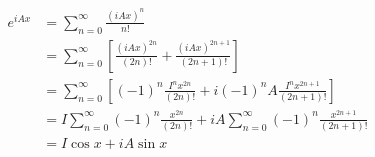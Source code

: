 \begingroup
%
\begin{align}
e^{i A x} &= \sum_{n=0}^{\infty}{\frac{\left( iAx \right)^n}{n!}} \\
&= \sum_{n=0}^{\infty}{\left[ \frac{\left( iAx \right)^{2n}}{\left( 2n \right)!} + \frac{\left( iAx \right)^{2n+1}}{\left( 2n + 1 \right)!} \right]} \\
&= \sum_{n=0}^{\infty}{\left[ \left( -1 \right)^n \frac{I^n x^{2n}}{\left( 2n \right)!} + i \left( - 1 \right)^n A \frac{I^n x^{2n+1}}{\left( 2n + 1 \right)!} \right]} \\
&= I \sum_{n=0}^{\infty}{\left( -1 \right)^n \frac{x^{2n}}{\left( 2n \right)!}} + i A \sum_{n=0}^{\infty}{\left( - 1 \right)^n \frac{x^{2n+1}}{\left( 2n + 1 \right)!}} \\
&= I \cos x + i A \sin x
\end{align}
\endgroup
